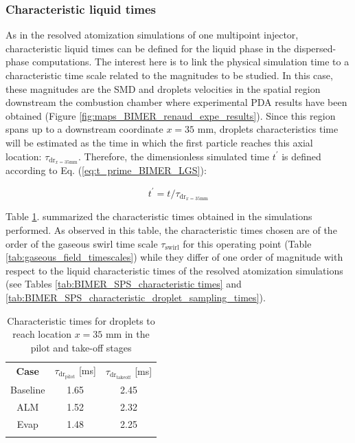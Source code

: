 \clearpage


\subsubsection*{Characteristic liquid times}

As in the resolved atomization simulations of one multipoint injector, characteristic liquid times can be defined for the liquid phase in the dispersed-phase computations. The interest here is to link the physical simulation time to a characteristic time scale related to the magnitudes to be studied. In this case, these magnitudes are the SMD and droplets velocities in the spatial region downstream the combustion chamber where experimental PDA results have been obtained (Figure \ref{fig:maps_BIMER_renaud_expe_results}). Since this region spans up to a downstream coordinate $x = 35$ mm, droplets characteristics time will be estimated as the time in which the first particle reaches this axial location: $\tau_{\mathrm{dr}_{x=35\mathrm{mm}}}$. Therefore, the dimensionless simulated time $t^{\prime}$ is defined according to Eq. (\ref{eq:t_prime_BIMER_LGS}):

\begin{equation}
\label{eq:t_prime_BIMER_LGS}
t^{\prime} = t / \tau_{\mathrm{dr}_{x=35\mathrm{mm}}}
\end{equation}


Table \ref{tab:BIMER_dispersed_phase_characteristic_times}.  summarized the characteristic times obtained in the simulations performed. As observed in this table, the characteristic times chosen are of the order of the gaseous swirl time scale $\tau_\mathrm{swirl}$ for this operating point (Table \ref{tab:gaseous_field_timescales}) while they differ of one order of magnitude with respect to the liquid characteristic times of the resolved atomization simulations (see Tables \ref{tab:BIMER_SPS_characteristic times} and \ref{tab:BIMER_SPS_characteristic_droplet_sampling_times}).  %


\begin{table}[!h]
\centering
\caption{Characteristic times for droplets to reach location $x = 35$ mm in the pilot and take-off stages }
\begin{tabular}{ccc}
\thickhline
\textbf{Case} & $\tau_{\mathrm{dr}_\mathrm{pilot}}$ [ms] & $\tau_{\mathrm{dr}_\mathrm{takeoff}}$ [ms] \\
\thickhline
Baseline & 1.65 & 2.45 \\  %
ALM & 1.52 & 2.32 \\ %
Evap & 1.48 & 2.25 \\ %
\thickhline
\end{tabular}
\label{tab:BIMER_dispersed_phase_characteristic_times}
\end{table}





